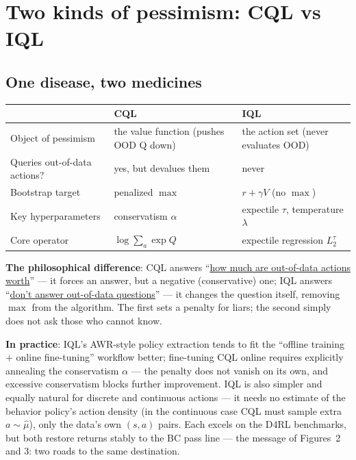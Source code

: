 \documentclass{article}
\begin{document}
\section*{Two kinds of pessimism: CQL vs IQL}

\subsection*{One disease, two medicines}

\begin{center}
\small
\setlength{\tabcolsep}{3pt}
\begin{tabular}{>{\raggedright\arraybackslash}p{}|>{\raggedright\arraybackslash}p{}|>{\raggedright\arraybackslash}p{}}
 & \textbf{CQL} & \textbf{IQL} \\
\hline
Object of pessimism & the value function (pushes OOD Q down) & the action set (never evaluates OOD) \\
Queries out-of-data actions? & yes, but devalues them & never \\
Bootstrap target & penalized $\max$ & $r + \gamma V$ (no $\max$) \\
Key hyperparameters & conservatism $\alpha$ & expectile $\tau$, temperature $\lambda$ \\
Core operator & $\log\sum_a\exp Q$ & expectile regression $L_2^\tau$ \\
\end{tabular}
\end{center}

\textbf{The philosophical difference}: CQL answers ``\underline{how much are out-of-data actions worth}'' --- it forces an answer, but a negative (conservative) one; IQL answers ``\underline{don't answer out-of-data questions}'' --- it changes the question itself, removing $\max$ from the algorithm. The first sets a penalty for liars; the second simply does not ask those who cannot know.

\textbf{In practice}: IQL's AWR-style policy extraction tends to fit the ``offline training $+$ online fine-tuning'' workflow better; fine-tuning CQL online requires explicitly annealing the conservatism $\alpha$ --- the penalty does not vanish on its own, and excessive conservatism blocks further improvement. IQL is also simpler and equally natural for discrete and continuous actions --- it needs no estimate of the behavior policy's action density (in the continuous case CQL must sample extra $a\sim\hat\mu$), only the data's own $(s,a)$ pairs. Each excels on the D4RL benchmarks, but both restore returns stably to the BC pass line --- the message of Figures~2 and 3: two roads to the same destination.
\end{document}

